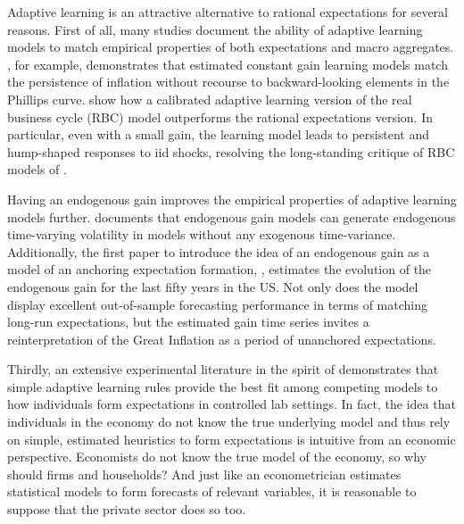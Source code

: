 \documentclass[11pt]{article}
\renewcommand{\[}{\begin{equation}}
\renewcommand{\]}{\end{equation}}
\begin{document}
Adaptive learning is an attractive alternative to rational expectations for several reasons. 
First of all, many studies document the ability of adaptive learning models to match empirical properties of both expectations and macro aggregates. \cite{milani2007expectations}, for example, demonstrates that estimated constant gain learning models match the persistence of inflation without recourse to backward-looking elements in the Phillips curve. \cite{eusepi2011expectations} show how a calibrated adaptive learning version of the real business cycle (RBC) model outperforms the rational expectations version. In particular, even with a small gain, the learning model leads to persistent and hump-shaped responses to iid shocks, resolving the long-standing critique of RBC models of \cite{cogley1993impulse}. 

Having an endogenous gain improves the empirical properties of adaptive learning models further. \cite{milani2014learning} documents that endogenous gain models can generate endogenous time-varying volatility  in models without any exogenous time-variance. Additionally, the first paper to introduce the idea of an endogenous gain as a model of an anchoring expectation formation, \cite{carvalho2019anchored}, estimates the evolution of the endogenous gain for the last fifty years in the US. Not only does the model display excellent out-of-sample forecasting performance in terms of matching long-run expectations, but the estimated gain time series invites a reinterpretation of the Great Inflation as a period of unanchored expectations. %

Thirdly, an extensive experimental literature in the spirit of \cite{anufriev2012evolutionary} demonstrates that simple adaptive learning rules provide the best fit among competing models to how individuals form expectations in controlled lab settings. In fact, the idea that individuals in the economy do not know the true underlying model and thus rely on simple, estimated heuristics to form expectations is intuitive from an economic perspective. Economists do not know the true model of the economy, so why should firms and households? And just like an econometrician estimates statistical models to form forecasts of relevant variables, it is reasonable to suppose that the private sector does so too.
\end{document}
